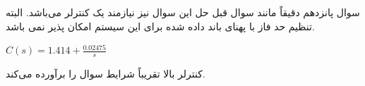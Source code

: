 \documentclass{article}
\begin{document}
\begin{problem}{سوال پانزدهم}
	دقیقاً مانند سوال قبل حل این سوال نیز نیازمند یک کنترلر  می‌باشد.
	البته تنظیم حد فاز با پهنای باند داده شده برای این سیستم امکان پذیر نمی باشد.
	
	$C(s) = 1.414 + \frac{0.02475}{s}$
	
	کنترلر بالا تقریباً شرایط سوال را برآورده می‌کند.
	
\end{problem}
\end{document}
